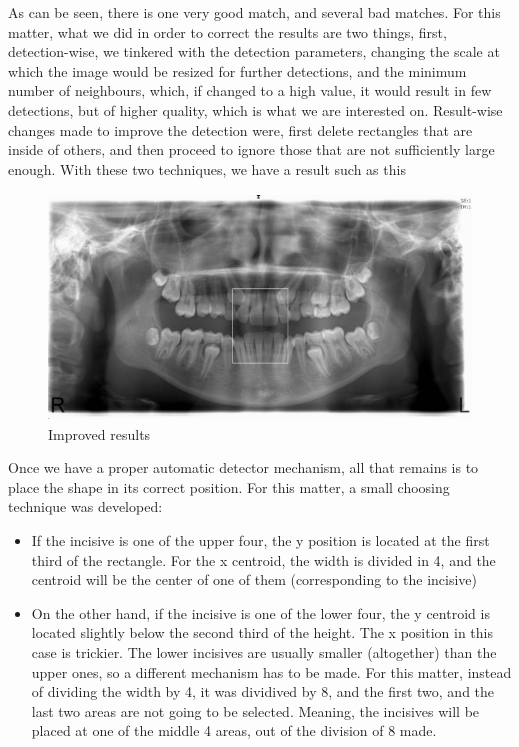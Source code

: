 As can be seen, there is one very good match, and several bad matches. For this
matter, what we did in order to correct the results are two things, 
first, detection-wise, we tinkered with the detection parameters, changing the
scale at which the image would be resized for further detections, and the
minimum number of neighbours, which, if changed to a high value, it would result
in few detections, but of higher quality, which is what we are interested on.
Result-wise changes made to improve the detection were, first delete rectangles
that are inside of others, and then proceed to ignore those that are not
sufficiently large enough. With these two techniques, we have a result such as
this

\begin{figure}[h]
  \centering
  \includegraphics[height=6cm]{img/teeth_detection_2}
  \caption{Improved results}
\end{figure}

Once we have a proper automatic detector mechanism, all that remains is to place
the shape in its correct position. For this matter, a small choosing technique
was developed:
\begin{itemize}
  \item If the incisive is one of the upper four, the y position is located at
the first third of the rectangle. For the x centroid, the width is divided in 4,
and the centroid will be the center of one of them (corresponding to the
incisive)
  \item On the other hand, if the incisive is one of the lower four, the y
centroid is located slightly below the second third of the height. The x
position in this case is trickier. The lower incisives are usually smaller
(altogether) than the upper ones, so a different mechanism has to be made. For
this matter, instead of dividing the width by 4, it was dividived by 8, and the
first two, and the last two areas are not going to be selected. Meaning, the
incisives will be placed at one of the middle 4 areas, out of the division of 8
made.  
\end{itemize}
